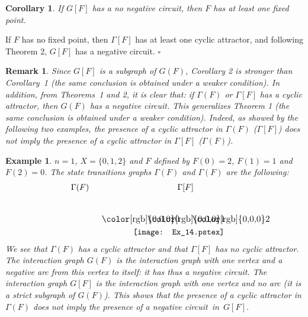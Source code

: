 \documentclass[11pt]{article}
\newtheorem{remark}{Remark}
\newtheorem{corollary}{Corollary}
\newtheorem{example}{Example}
\def\proof{\noindent{\bf Proof --~}}
\def\cqfd{\hfill$\square$}
\begin{document}
\begin{corollary}
If $G[F]$ has a no negative circuit, then $F$ has at least one fixed
point.
\end{corollary}


\proof 
If $F$ has no fixed point, then $\Gamma[F]$ has at least one cyclic
attractor, and following Theorem 2, $G[F]$ has a negative circuit.
\cqfd


\begin{remark}
{\emph{Since $G[F]$ is a subgraph of $G(F)$, Corollary 2 is
stronger than Corollary~1 (the same conclusion is obtained under a
weaker condition). In addition, from Theorems~1 and 2, it is clear
that: {\emph{if $\Gamma(F)$ or $\Gamma[F]$ has a cyclic attractor, then
$G(F)$ has a negative circuit}}. This generalizes Theorem 1 (the same
conclusion is obtained under a weaker condition). Indeed, as showed by
the following two examples, the presence of a cyclic attractor in
$\Gamma(F)$ ($\Gamma[F]$) does not imply the presence of a
cyclic attractor in $\Gamma[F]$ ($\Gamma(F)$).}}
\end{remark}


\begin{example}
$n=1$, $X=\{0,1,2\}$ and $F$ defined by $F(0)=2$, $F(1)=1$ and
$F(2)=0$. The state transitions graphs $\Gamma(F)$ and $\Gamma(F)$ are
the following:
\[
\begin{array}{ccc}
\Gamma(F)&&\Gamma[F]\\[5mm]
&~~~~~~~~~~&\begin{picture}(0,0)\texttt{[image: Ex\_14.pstex]}\end{picture}\setlength{\unitlength}{3947sp}\begingroup\makeatletter\ifx\SetFigFont\undefined \gdef\SetFigFont#1#2#3#4#5{\reset@font\fontsize{#1}{#2pt}\fontfamily{#3}\fontseries{#4}\fontshape{#5}\selectfont}\fi\endgroup \begin{picture}(2104,602)(1800,-1862)
\put(1951,-1606){\makebox(0,0)[b]{\smash{{\SetFigFont{11}{13.2}{\rmdefault}{\mddefault}{\updefault}{\color[rgb]{0,0,0}$0$}}}}}
\put(2866,-1606){\makebox(0,0)[b]{\smash{{\SetFigFont{11}{13.2}{\rmdefault}{\mddefault}{\updefault}{\color[rgb]{0,0,0}$1$}}}}}
\put(3766,-1606){\makebox(0,0)[b]{\smash{{\SetFigFont{11}{13.2}{\rmdefault}{\mddefault}{\updefault}{\color[rgb]{0,0,0}$2$}}}}}
\end{picture} \end{array}
\]
We see that $\Gamma(F)$ has a cyclic attractor and that $\Gamma[F]$
has no cyclic attractor. The interaction graph $G(F)$ is the
interaction graph with one vertex and a negative arc from this vertex
to itself: it has thus a negative circuit. The interaction graph
$G[F]$ is the interaction graph with one vertex and no arc (it is a
strict subgraph of $G(F)$). This shows that the presence of a cyclic
attractor in $\Gamma(F)$ does not imply the presence of a negative
circuit~in~$G[F]$.
\end{example}
\end{document}
